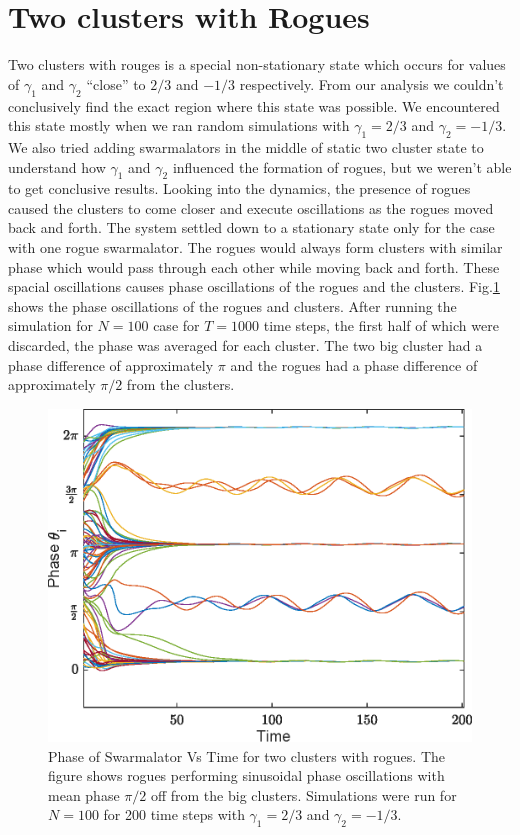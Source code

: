 \documentclass[superscriptaddress,reprint,amssymb, amsmath,aps, pre]{revtex4-1}
\begin{document}
{    \section{Two clusters with Rogues}
    {
        Two clusters with rouges is a special non-stationary state which occurs for values of \(\gamma_1\) and \(\gamma_2\) ``close'' to \(2/3\) and \(-1/3\) respectively. From our analysis we couldn't conclusively find the exact region where this state was possible. We encountered this state mostly when we ran random simulations with \(\gamma_1 = 2/3\) and \(\gamma_2 = -1/3\). We also tried adding swarmalators in the middle of static two cluster state to understand how \(\gamma_1\) and \(\gamma_2\) influenced the formation of rogues, but we weren't able to get conclusive results. Looking into the dynamics, the presence of rogues caused the clusters to come closer and execute oscillations as the rogues moved back and forth. The system settled down to a stationary state only for the case with one rogue swarmalator. The rogues would always form clusters with similar phase which would pass through each other while moving back and forth. These spacial oscillations causes phase oscillations of the rogues and the clusters. Fig.\ref{fig:PhaseVtimeRogues} shows the phase oscillations of the rogues and clusters. After running the simulation for \(N = 100\) case for \(T = 1000\) time steps, the first half of which were discarded, the phase was averaged for each cluster. The two big cluster had a phase difference of approximately \(\pi\) and the rogues had a phase difference of approximately \(\pi/2\) from the clusters. 

        \begin{figure}[h!]
            \includegraphics[width = \linewidth]{PhaseVtimeRogues.eps}
            \caption{Phase of Swarmalator Vs Time for two clusters with rogues. The figure shows rogues performing sinusoidal phase oscillations with mean phase \(\pi/2\) off from the big clusters. Simulations were run for \(N = 100\) for 200 time steps with \(\gamma_1 = 2/3\) and \(\gamma_2 = -1/3\).} 
            \label{fig:PhaseVtimeRogues}
        \end{figure}
    }
}
\end{document}
